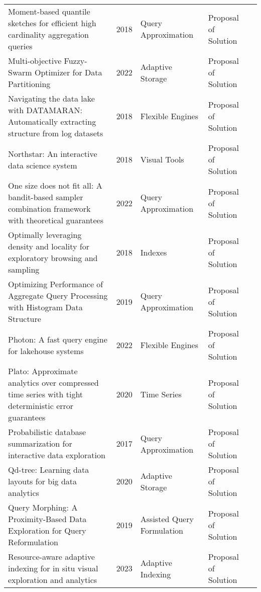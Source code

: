 \begin{longtable}{p{18em} l l l l}
Moment-based quantile sketches for efficient high cardinality aggregation queries & 2018 & Query Approximation & Proposal of Solution & \cite{gan_moment-based_2018}\\ 
Multi-objective {Fuzzy}-{Swarm} {Optimizer} for {Data} {Partitioning} & 2022 & Adaptive Storage & Proposal of Solution & \cite{goyal_multi-objective_2022}\\ 
Navigating the data lake with {DATAMARAN}: {Automatically} extracting structure from log datasets & 2018 & Flexible Engines & Proposal of Solution & \cite{10.1145/3183713.3183746}\\ 
Northstar: {An} interactive data science system & 2018 & Visual Tools & Proposal of Solution & \cite{10.14778/3229863.3240493}\\ 
One size does not fit all: {A} bandit-based sampler combination framework with theoretical guarantees & 2022 & Query Approximation & Proposal of Solution & \cite{10.1145/3514221.3517900}\\ 
Optimally leveraging density and locality for exploratory browsing and sampling & 2018 & Indexes & Proposal of Solution & \cite{10.1145/3209900.3209903}\\ 
Optimizing {Performance} of {Aggregate} {Query} {Processing} with {Histogram} {Data} {Structure} & 2019 & Query Approximation & Proposal of Solution & \cite{yong_optimizing_2019}\\ 
Photon: {A} fast query engine for lakehouse systems & 2022 & Flexible Engines & Proposal of Solution & \cite{10.1145/3514221.3526054}\\ 
Plato: {Approximate} analytics over compressed time series with tight deterministic error guarantees & 2020 & Time Series & Proposal of Solution & \cite{10.14778/3384345.3384357}\\ 
Probabilistic database summarization for interactive data exploration & 2017 & Query Approximation & Proposal of Solution & \cite{10.14778/3115404.3115419}\\ 
Qd-tree: {Learning} data layouts for big data analytics & 2020 & Adaptive Storage & Proposal of Solution & \cite{yang_qd-tree_2020}\\ 
Query {Morphing}: {A} {Proximity}-{Based} {Data} {Exploration} for {Query} {Reformulation} & 2019 & Assisted Query Formulation & Proposal of Solution & \cite{patel_query_2019}\\ 
Resource-aware adaptive indexing for in situ visual exploration and analytics & 2023 & Adaptive Indexing & Proposal of Solution & \cite{maroulis_resource-aware_2023}\\ 

\end{longtable}
